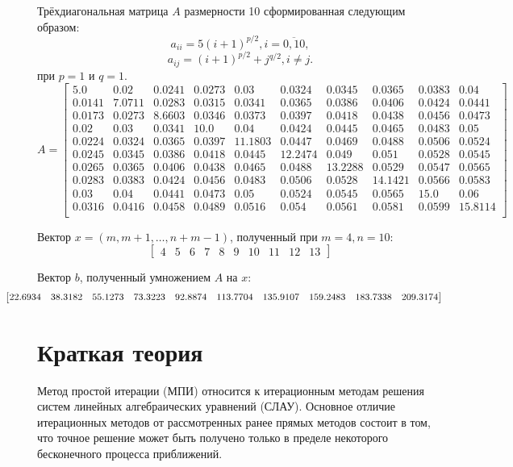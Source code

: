 \documentclass[12pt]{report}
\begin{document}
Трёхдиагональная матрица $A$ размерности 10 сформированная следующим образом:
\[
a_{ii} = 5(i+1)^{p/2}, i = \overline{0,10},
\]
\[
a_{ij} = (i + 1)^{p/2} + j^{q/2},  i \neq j.
\]
при $p = 1$ и $q = 1$.
\[A = 
\begin{bmatrix}
  5.0 & 0.02 & 0.0241 & 0.0273 & 0.03 & 0.0324 & 0.0345 & 0.0365 & 0.0383 & 0.04 \\
  0.0141 & 7.0711 & 0.0283 & 0.0315 & 0.0341 & 0.0365 & 0.0386 & 0.0406 & 0.0424 & 0.0441 \\
  0.0173 & 0.0273 & 8.6603 & 0.0346 & 0.0373 & 0.0397 & 0.0418 & 0.0438 & 0.0456 & 0.0473 \\ 
  0.02 & 0.03 & 0.0341 & 10.0 & 0.04 & 0.0424 & 0.0445 & 0.0465 & 0.0483 & 0.05 \\
  0.0224 & 0.0324 & 0.0365 & 0.0397 & 11.1803 & 0.0447 & 0.0469 & 0.0488 & 0.0506 & 0.0524 \\ 
  0.0245 & 0.0345 & 0.0386 & 0.0418 & 0.0445 & 12.2474 & 0.049 & 0.051 & 0.0528 & 0.0545 \\
  0.0265 & 0.0365 & 0.0406 & 0.0438 & 0.0465 & 0.0488 & 13.2288 & 0.0529 & 0.0547 & 0.0565 \\
  0.0283 & 0.0383 & 0.0424 & 0.0456 & 0.0483 & 0.0506 & 0.0528 & 14.1421 & 0.0566 & 0.0583 \\ 
  0.03 & 0.04 & 0.0441 & 0.0473 & 0.05 & 0.0524 & 0.0545 & 0.0565 & 15.0 & 0.06 \\
  0.0316 & 0.0416 & 0.0458 & 0.0489 & 0.0516 & 0.054 & 0.0561 & 0.0581 & 0.0599 & 15.8114 \\
\end{bmatrix}
\]

Вектор $x = (m, m+1, \ldots, n+m-1)$, полученный при $m = 4, n = 10$:
\[
\begin{bmatrix}
   4 & 5 & 6 & 7 & 8 & 9 & 10 & 11 & 12 & 13  
\end{bmatrix}
\]

Вектор $b$, полученный умножением $A$ на $x$:
\[
\hspace{-1.2cm}\begin{bmatrix}
   22.6934 & 38.3182 & 55.1273 & 73.3223 & 92.8874 & 113.7704 & 135.9107 & 159.2483 & 183.7338 & 209.3174
\end{bmatrix}
\]


\section{Краткая теория}


Метод простой итерации (МПИ) относится к итерационным методам
решения систем линейных алгебраических уравнений (СЛАУ). Основное
отличие итерационных методов от рассмотренных ранее прямых методов
состоит в том, что точное решение может быть получено только в пределе
некоторого бесконечного процесса приближений.
\end{document}
